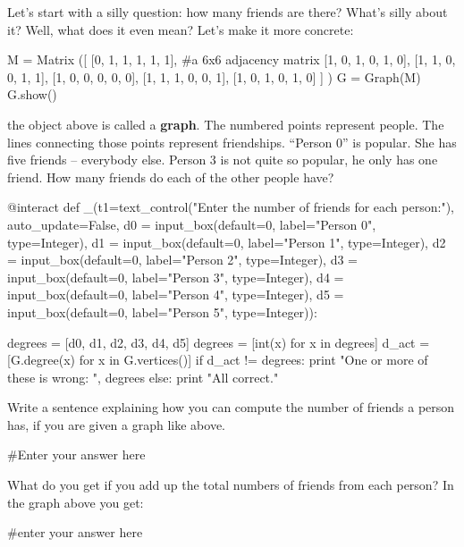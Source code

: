 Let's start with a silly question:  how many friends are there?
What's silly about it?  Well, what does it even mean?  Let's make it
more concrete:

\begin{sageverbatim}
M = Matrix ([ [0, 1, 1, 1, 1, 1],   #a 6x6 adjacency matrix
              [1, 0, 1, 0, 1, 0], 
              [1, 1, 0, 0, 1, 1],
              [1, 0, 0, 0, 0, 0],
              [1, 1, 1, 0, 0, 1],
              [1, 0, 1, 0, 1, 0] ] )
G = Graph(M)
G.show()
\end{sageverbatim}

the object above is called a \textbf{graph}.  The numbered points
represent people.  The lines connecting those points represent
friendships.  ``Person 0'' is popular.  She has five friends --
everybody else.  Person 3 is not quite so popular, he only has one
friend.  How many friends do each of the other people have?

\begin{sageverbatim}
@interact
def _(t1=text_control("Enter the number of friends for each person:"), auto_update=False, 
    d0 = input_box(default=0, label="Person 0", type=Integer),
    d1 = input_box(default=0, label="Person 1", type=Integer),
    d2 = input_box(default=0, label="Person 2", type=Integer),
    d3 = input_box(default=0, label="Person 3", type=Integer),
    d4 = input_box(default=0, label="Person 4", type=Integer),
    d5 = input_box(default=0, label="Person 5", type=Integer)):

    degrees = [d0, d1, d2, d3, d4, d5]
    degrees = [int(x) for x in degrees]
    d_act = [G.degree(x) for x in G.vertices()]
    if d_act != degrees:
        print "One or more of these is wrong: ", degrees
    else:
        print "All correct."
\end{sageverbatim}

Write a sentence explaining how you can compute the number of friends
a person has, if you are given a graph like above.

\begin{sageverbatim}
#Enter your answer here

\end{sageverbatim}

What do you get if you add up the total numbers of friends from each person? In
the graph above you get:

\begin{sageverbatim}
#enter your answer here

\end{sageverbatim}

